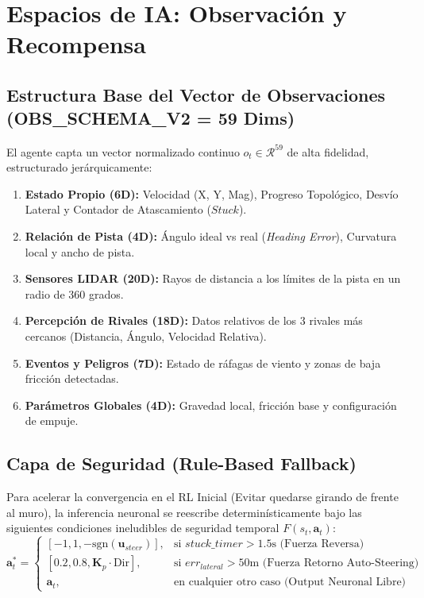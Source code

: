 \documentclass[a4paper,11pt]{article}
\begin{document}
\section{Espacios de IA: Observación y Recompensa}

\subsection{Estructura Base del Vector de Observaciones (OBS\_SCHEMA\_V2 = 59 Dims)}
El agente capta un vector normalizado continuo $o_t \in \mathcal{R}^{59}$ de alta fidelidad, estructurado jerárquicamente:
\begin{enumerate}
    \item \textbf{Estado Propio (6D):} Velocidad (X, Y, Mag), Progreso Topológico, Desvío Lateral y Contador de Atascamiento ($Stuck$).
    \item \textbf{Relación de Pista (4D):} Ángulo ideal vs real (\textit{Heading Error}), Curvatura local y ancho de pista.
    \item \textbf{Sensores LIDAR (20D):} Rayos de distancia a los límites de la pista en un radio de 360 grados.
    \item \textbf{Percepción de Rivales (18D):} Datos relativos de los 3 rivales más cercanos (Distancia, Ángulo, Velocidad Relativa).
    \item \textbf{Eventos y Peligros (7D):} Estado de ráfagas de viento y zonas de baja fricción detectadas.
    \item \textbf{Parámetros Globales (4D):} Gravedad local, fricción base y configuración de empuje.
\end{enumerate}

\subsection{Capa de Seguridad (Rule-Based Fallback)}
Para acelerar la convergencia en el RL Inicial (Evitar quedarse girando de frente al muro), la inferencia neuronal se reescribe determinísticamente bajo las siguientes condiciones ineludibles de seguridad temporal $F(s_t, \mathbf{a}_t)$:
$$ 
\mathbf{a}^*_t = 
\begin{cases} 
[-1, 1, -\text{sgn}(\mathbf{u}_{steer})], & \text{si } stuck\_timer > 1.5\text{s (Fuerza Reversa)}\\
[0.2, 0.8, \mathbf{K}_p \cdot \text{Dir}], & \text{si } err_{lateral} > 50\text{m (Fuerza Retorno Auto-Steering)} \\
\mathbf{a}_t, & \text{en cualquier otro caso (Output Neuronal Libre)} 
\end{cases}
$$
\end{document}
